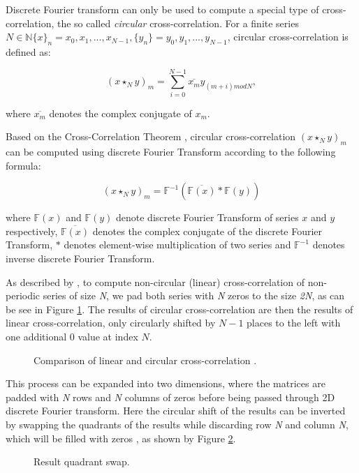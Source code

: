 Discrete Fourier transform can only be used to compute a special type of cross-correlation, the so called \textit{circular} cross-correlation.
For a finite series $N \in \mathbb{N} \{x\}_n = x_0, x_1, ..., x_{N-1}, \{y_n\} = y_0, y_1, ..., y_{N-1}$, circular cross-correlation is defined as:

\[
(x \star_N y)_m = \sum_{i=0}^{N-1} \overline{x_m} y_{(m + i) mod N},
\]

where $\overline{x_m}$ denotes the complex conjugate of $x_m$.


Based on the Cross-Correlation Theorem \citep{thesis:wang}, circular cross-correlation $(x \star_N y)_m$ can be computed using discrete Fourier Transform according to the following formula:

\[
(x \star_N y)_m = \mathbb{F}^{-1}(\overline{\mathbb{F}(x)}*\mathbb{F}(y))
\]

where $\mathbb{F}(x)$ and $\mathbb{F}(y)$ denote discrete Fourier Transform of series $x$ and $y$ respectively, $\overline{\mathbb{F}(x)}$ denotes the complex conjugate of the discrete Fourier Transform, $*$ denotes element-wise multiplication of two series and $\mathbb{F}^{-1}$ denotes inverse discrete Fourier Transform.

As described by \citet{misko}, to compute non-circular (linear) cross-correlation of non-periodic series of size \textit{N}, we pad both series with \textit{N} zeros to the size \textit{2N}, as can be see in Figure \ref{fig:circular_cross_corr}. The results of circular cross-correlation are then the results of linear cross-correlation, only circularly shifted by $N-1$ places to the left with one additional 0 value at index $N$. 

\begin{figure}[h]
	\centering
	\def\svgwidth{0.8\textwidth}
	
	\caption{Comparison of linear and circular cross-correlation \citep{misko}.}
	\label{fig:circular_cross_corr}
\end{figure}


This process can be expanded into two dimensions, where the matrices are padded with \textit{N} rows and \textit{N} columns of zeros before being passed through 2D discrete Fourier transform. Here the circular shift of the results can be inverted by swapping the quadrants of the results while discarding row \textit{N} and column \textit{N}, which will be filled with zeros \citep{misko}, as shown by Figure \ref{fig:quadrant_swap}. 

\begin{figure}[h]
	\centering
	\def\svgwidth{0.8\textwidth}
	
	\caption{Result quadrant swap.}
	\label{fig:quadrant_swap}
\end{figure}



